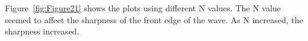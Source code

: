\begin{enumerate}
\begin{enumerate}
		Figure~\ref{fig:Figure21} shows the plots using different N values.  The N value seemed to affect the sharpness of the front edge of the wave. As N increased, the sharpness increased.  
		\begin{figure}
			[htbp] \centering 
			 \hspace{5pt} 
			 \label{fig:Figures_plot2p1_n_is_160}
			\subfigure[$N=320$ \label{fig:Figures_plot2p1_n_is_320}]{
}
\end{figure}
\end{enumerate}
\end{enumerate}
